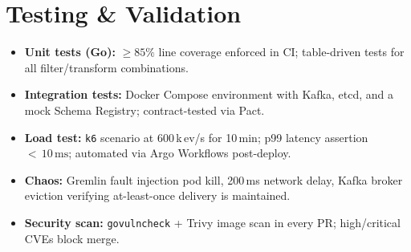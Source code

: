 \section{Testing \& Validation}

\begin{itemize}[leftmargin=1.4em, itemsep=3pt, topsep=3pt]
  \item \textbf{Unit tests (Go):} $\geq 85\%$ line coverage enforced in CI; table-driven
        tests for all filter/transform combinations.
  \item \textbf{Integration tests:} Docker Compose environment with Kafka, etcd, and a
        mock Schema Registry; contract-tested via Pact.
  \item \textbf{Load test:} \texttt{k6} scenario at 600\,k\,ev/s for 10\,min;
        p99 latency assertion ${<}\,10\,\mathrm{ms}$; automated via Argo Workflows post-deploy.
  \item \textbf{Chaos:} Gremlin fault injection \textendash{} pod kill, 200\,ms network delay,
        Kafka broker eviction \textendash{} verifying at-least-once delivery is maintained.
  \item \textbf{Security scan:} \texttt{govulncheck} + Trivy image scan in every PR;
        high/critical CVEs block merge.
\end{itemize}

